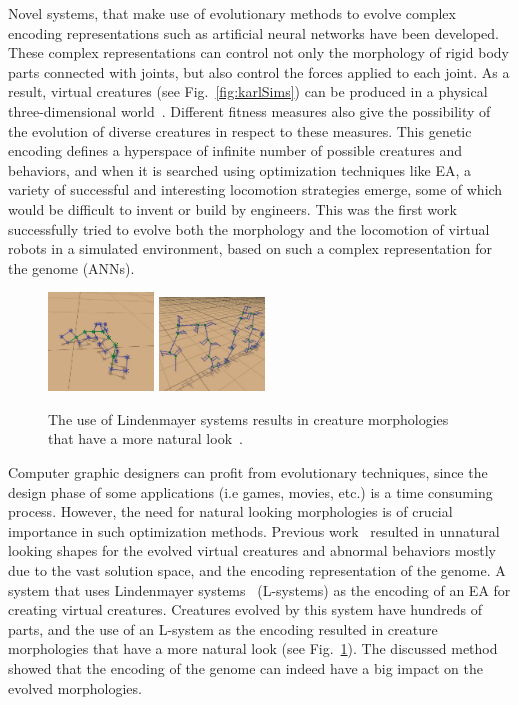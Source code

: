 Novel systems, that make use of evolutionary methods to evolve complex encoding representations such as artificial neural networks have been developed. These complex representations can control not only the morphology of rigid body parts connected with joints, but also control the forces applied to each joint. As a result, virtual creatures (see Fig.~\ref{fig:karlSims}) can be produced in a physical three-dimensional world~\citep{sims1994evolving}. Different fitness measures also give the possibility of the evolution of diverse creatures in respect to these measures. This genetic encoding defines a hyperspace of infinite number of possible creatures and behaviors, and when it is searched using optimization techniques like EA, a variety of successful and interesting locomotion strategies emerge, some of which would be difficult to invent or build by engineers. This was the first work successfully tried to evolve both the morphology and the locomotion of virtual robots in a simulated environment, based on such a complex representation for the genome (ANNs).

\begin{figure}[t!]
\centering
\includegraphics[width=0.25\textwidth,height=0.2\textwidth]{../Figures/Misc/lsystems1.png}
\includegraphics[width=0.25\textwidth,height=0.2\textwidth]{../Figures/Misc/lsystems2.png}
\caption{The use of Lindenmayer systems results in creature morphologies that have a more natural look~\citep{hornby2001evolving}.}
\label{fig:lsystems}
\end{figure}

Computer graphic designers can profit from evolutionary techniques, since the design phase of some applications (i.e games, movies, etc.) is a time consuming process. However, the need for natural looking morphologies is of crucial importance in such optimization methods. Previous work~\citep{lipson2000automatic,sims1994evolving} resulted in unnatural looking shapes for the evolved virtual creatures and abnormal behaviors mostly due to the vast solution space, and the encoding representation of the genome. A system that uses Lindenmayer systems~\citep{hornby2001evolving} (L-systems) as the encoding of an EA for creating virtual creatures. Creatures evolved by this system have hundreds of parts, and the use of an L-system as the encoding resulted in creature morphologies that have a more natural look (see Fig.~\ref{fig:lsystems}). The discussed method~\citep{hornby2001evolving} showed that the encoding of the genome can indeed have a big impact on the evolved morphologies.

